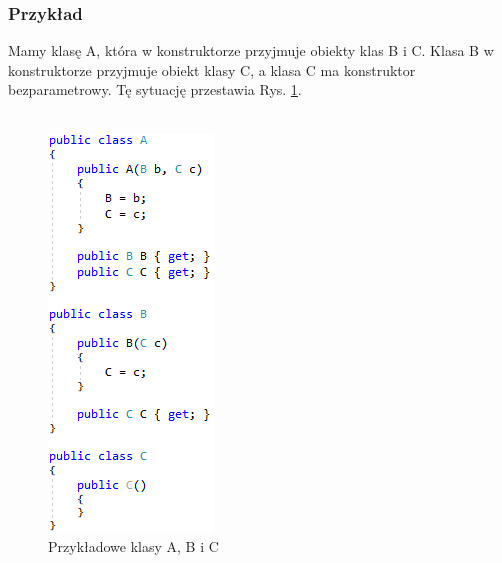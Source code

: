 \documentclass[12pt]{article}
\begin{document}
\subsubsection{Przykład}
Mamy klasę A, która w konstruktorze przyjmuje obiekty klas B i C. Klasa B w konstruktorze przyjmuje obiekt klasy C, a klasa C ma konstruktor bezparametrowy. Tę sytuację przestawia Rys.  \ref{fig:Example_Classes}.\\ \\
\begin{figure}[H]
	\begin{center}
  		\includegraphics{Example_Classes.png}
  		\caption{Przykładowe klasy A, B i C}
  		\label{fig:Example_Classes}
	\end{center}
\end{figure}
\end{document}
